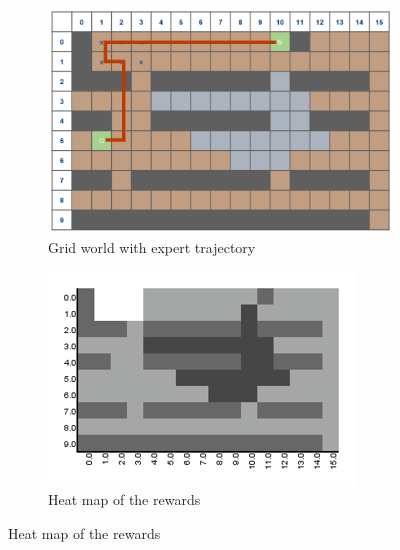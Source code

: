 \documentclass[10pt,a4paper,twocolumn]{article}
\begin{document}
\begin{figure}[h]
\begin{subfigure}[b]{0.5\textwidth}
	\includegraphics[width=\textwidth]{experiment_2_gridworld}
	\caption{Grid world with expert trajectory}
	\label{fig:experiment1trajectory}
\end{subfigure}
\begin{subfigure}[b]{0.5\textwidth}
	\includegraphics[width=\textwidth]{experiment_2_heatmap}
	\caption{Heat map of the rewards}
	\label{fig:experiment1heatmap}
\end{subfigure}
\end{figure}
\end{document}
